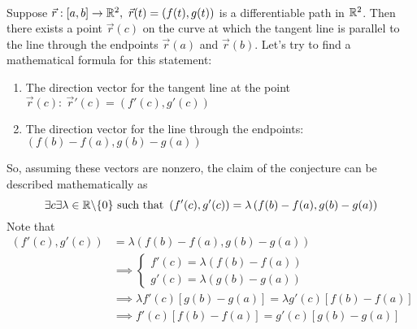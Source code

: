 \begin{conjecture}\leavevmode \\
\label{Conj3}
Suppose $\vec{r}: [a,b] \to \mathbb{R}^2, ~\vec{r}(t) = \left(f(t), g(t)\right)$ is a differentiable path in $\mathbb{R}^2$. Then there exists a point $\vec{r}(c)$ on the curve at which the tangent line is parallel to the line through the endpoints $\vec{r}(a)$ and $\vec{r}(b)$. Let's try to find a mathematical formula for this statement:
    \begin{enumerate}[$*)$]
        \item The direction vector for the tangent line at the point $\vec{r}(c): ~\vec{r}'(c) = \left(f'(c), g'(c)\right)$
        \item The direction vector for the line through the endpoints: $\left(f(b) - f(a), g(b) - g(a)\right)$
    \end{enumerate}
So, assuming these vectors are nonzero, the claim of the conjecture can be described mathematically as
$$
    \exists c \exists \lambda \in \mathbb{R} \backslash \{0\} \text{ such that } \left(f'(c), g'(c)\right) = \lambda \left(f(b) - f(a), g(b) - g(a)\right)
$$
Note that
\begin{align*}
    (f'(c), g'(c)) &= \lambda \left(f(b) - f(a), g(b) - g(a)\right) \\ 
    &\implies \begin{cases*}
        f'(c) = \lambda \left(f(b) - f(a)\right) \\
        g'(c) = \lambda \left(g(b) - g(a)\right)
    \end{cases*} \\
    &\implies \lambda f'(c)\left[g(b) - g(a)\right] = \lambda g'(c) \left[f(b) - f(a)\right] \\
    &\implies f'(c) \left[f(b) - f(a) \right] = g'(c) \left[g(b) - g(a)\right]
\end{align*}
\end{conjecture}